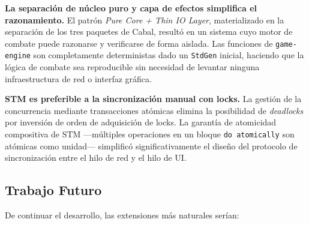\textbf{La separación de núcleo puro y capa de efectos simplifica el razonamiento.} El patrón \textit{Pure Core + Thin IO Layer}, materializado en la separación de los tres paquetes de Cabal, resultó en un sistema cuyo motor de combate puede razonarse y verificarse de forma aislada. Las funciones de \texttt{game-engine} son completamente deterministas dado un \texttt{StdGen} inicial, haciendo que la lógica de combate sea reproducible sin necesidad de levantar ninguna infraestructura de red o interfaz gráfica.

\textbf{STM es preferible a la sincronización manual con locks.} La gestión de la concurrencia mediante transacciones atómicas elimina la posibilidad de \textit{deadlocks} por inversión de orden de adquisición de locks. La garantía de atomicidad compositiva de STM —múltiples operaciones en un bloque \texttt{do atomically} son atómicas como unidad— simplificó significativamente el diseño del protocolo de sincronización entre el hilo de red y el hilo de UI.

\subsection{Trabajo Futuro}

De continuar el desarrollo, las extensiones más naturales serían:


